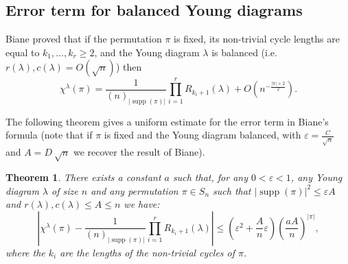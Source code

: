 \documentclass[12pt]{amsart}
\theoremstyle{plain}
\newtheorem{theorem}[lemma]{Theorem}
\theoremstyle{remark}
\DeclareMathOperator{\supp}{supp}
\begin{document}
\subsection{Error term for balanced Young diagrams}


Biane \cite{Biane1998}
proved that if the permutation $\pi$ is fixed, its non-trivial cycle lengths are
equal to $k_1,\dots,k_r\geq 2$, and the Young diagram $\lambda$
is balanced (i.e.\ $r(\lambda),c(\lambda)=O(\sqrt{n})$) then
$$\chi^\lambda(\pi) = \frac{1}{(n)_{|\supp(\pi)|}}
\prod_{i=1}^r R_{k_i+1}(\lambda) + O\left(n^{-\frac{|\pi|+2}{2}}\right).$$

The following theorem gives a uniform estimate for the error term in
Biane's formula
(note that if $\pi$ is fixed and the Young diagram balanced, 
with $\varepsilon = \frac{C}{ \sqrt{ n } }$ and $A=D\ \sqrt{ n }$ we recover the result of Biane).


\begin{theorem}
\label{theo:equiv-cumulants}
There exists a constant $a$ such that, for any $0 < \varepsilon < 1$, any Young diagram $\lambda$ of size $n$ and any permutation $\pi \in S_n$ such that
$|\supp(\pi)|^2 \leq \varepsilon A$ and $r(\lambda),c(\lambda)\leq A\leq n$ we
have:
$$\left|\chi^\lambda(\pi) - \frac{1}{(n)_{|\supp(\pi)|}}
\prod_{i=1}^r R_{k_i+1}(\lambda)\right| \leq 
\left(\varepsilon^2 +
\frac{A}{n} \varepsilon \right) \left(\frac{a A}{n}\right)^{|\pi|},
$$
where the $k_i$ are the lengths of the non-trivial cycles of $\pi$.
\end{theorem}
\end{document}
